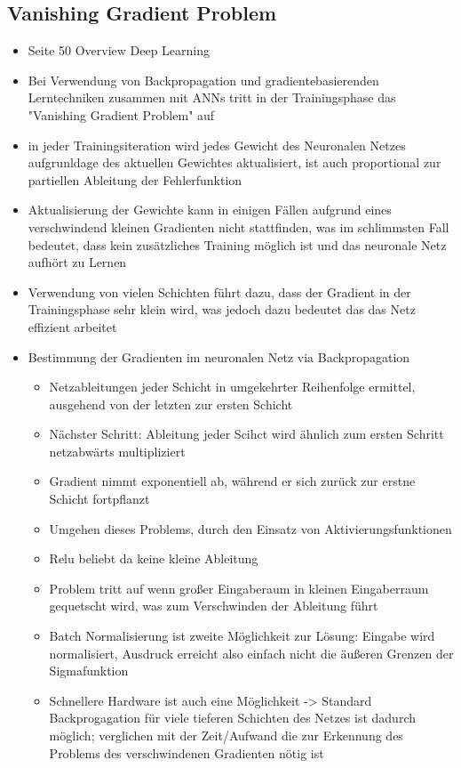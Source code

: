 \subsection{Vanishing Gradient Problem}
\begin{itemize}
    \item Seite 50 Overview Deep Learning
    \item Bei Verwendung von Backpropagation und gradientebasierenden Lerntechniken  zusammen mit ANNs tritt in der Trainingsphase das "Vanishing Gradient Problem" auf
    \item in jeder Trainingsiteration wird jedes Gewicht des Neuronalen Netzes aufgrunldage des aktuellen Gewichtes aktualisiert, ist auch proportional zur partiellen Ableitung der Fehlerfunktion
    \item Aktualisierung der Gewichte kann in einigen Fällen aufgrund eines verschwindend kleinen Gradienten nicht stattfinden, was im schlimmsten Fall bedeutet, dass kein zusätzliches Training möglich ist und das neuronale Netz aufhört zu Lernen
    \item Verwendung von vielen Schichten führt dazu, dass der Gradient in der Trainingsphase sehr klein wird, was jedoch dazu bedeutet das das Netz effizient arbeitet
    \item Bestimmung der Gradienten im neuronalen Netz via Backpropagation
    \begin{itemize}
        \item Netzableitungen jeder Schicht in umgekehrter Reihenfolge ermittel, ausgehend von der letzten zur ersten Schicht
        \item Nächster Schritt: Ableitung jeder Scihct wird ähnlich zum ersten Schritt netzabwärts multipliziert
        \item Gradient nimmt exponentiell ab, während er sich zurück zur erstne Schicht fortpflanzt
        \item Umgehen dieses Problems, durch den Einsatz von Aktivierungsfunktionen
        \item Relu beliebt da keine kleine Ableitung
        \item Problem tritt auf wenn großer Eingaberaum in kleinen Eingaberraum gequetscht wird, was zum Verschwinden der Ableitung führt
        \item Batch Normalisierung ist zweite Möglichkeit zur Lösung: Eingabe wird normalisiert, Ausdruck erreicht also einfach nicht die äußeren Grenzen der Sigmafunktion
        \item Schnellere Hardware ist auch eine Möglichkeit -> Standard Backprogagation für viele tieferen Schichten des Netzes ist dadurch möglich; verglichen mit der Zeit/Aufwand die zur Erkennung des Problems des verschwindenen Gradienten nötig ist
    \end{itemize}
\end{itemize}
